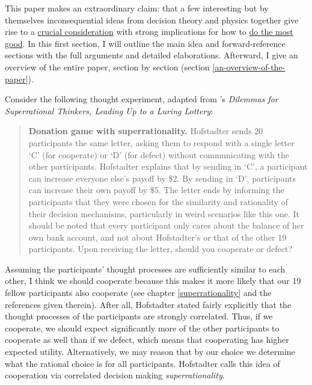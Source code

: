 This paper makes an extraordinary claim: that a few interesting but by
themselves inconsequential ideas from decision theory and physics
together give rise to a
\href{https://concepts.effectivealtruism.org/concepts/the-importance-of-crucial-considerations/}{crucial
consideration} with strong implications for how to
\href{https://en.wikipedia.org/wiki/Effective_altruism}{do the
most good}. In this first section, I will outline the main idea and
forward-reference sections with the full arguments and detailed
elaborations. Afterward, I give an overview of the entire paper, section
by section (section
\ref{an-overview-of-the-paper}).

Consider the following thought experiment, adapted from 
\citeauthor{Hofstadter1983-az}'s \citeyear{Hofstadter1983-az} \textit{Dilemmas
for Superrational Thinkers, Leading Up to a Luring Lottery}:

\begin{quote}
\textbf{Donation game with superrationality.} Hofstadter sends 20
participants the same letter, asking them to respond with a single
letter `C' (for cooperate) or `D' (for defect) without communicating
with the other participants. Hofstadter explains that by sending in `C',
a participant can increase everyone else's payoff by \$2. By sending in
`D', participants can increase their own payoff by \$5. The letter ends
by informing the participants that they were chosen for the similarity
and rationality of their decision mechanisms, particularly in weird
scenarios like this one. It should be noted that every participant only
cares about the balance of her own bank account, and not about
Hofstadter's or that of the other 19 participants. Upon receiving the
letter, should you cooperate or defect?
\end{quote}

Assuming the participants' thought processes are sufficiently similar to
each other, I think we should cooperate because this makes it more
likely that our 19 fellow participants also cooperate (see chapter
\ref{superrationality} and
the references given therein). After all, Hofstadter stated fairly
explicitly that the thought processes of the participants are strongly
correlated. Thus, if we cooperate, we should expect significantly more
of the other participants to cooperate as well than if we defect, which
means that cooperating has higher expected utility. Alternatively, we
may reason that by our choice we determine what the rational choice is
for all participants. Hofstadter calls this idea of cooperation via
correlated decision making \emph{superrationality}.

